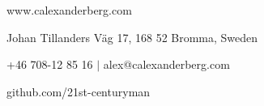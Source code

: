 \documentclass[../main.tex]{subfiles}
\begin{document}
\renewcommand{\maketitle}{
	\begin{center}
		{\LARGE\theauthor}

		www.calexanderberg.com

		Johan Tillanders Väg 17, 168 52 Bromma, Sweden

		+46 708-12 85 16 $|$ alex@calexanderberg.com

		github.com/21st-centuryman
	\end{center}
}

\maketitle
\end{document}
